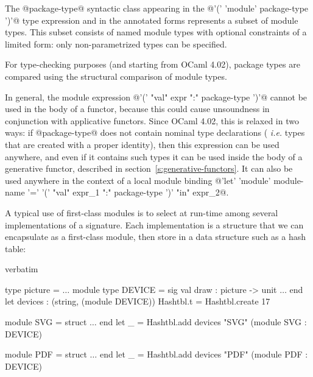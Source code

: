 The @package-type@ syntactic class appearing in the  @'(' 'module'
package-type ')'@ type expression and in the annotated forms represents a
subset of module types.
This subset consists of named module types with optional constraints
of a limited form: only non-parametrized types can be specified.

For type-checking purposes (and starting from OCaml 4.02), package types
are compared using the structural comparison of module types.

In general, the module expression @'(' "val" expr ":" package-type
')'@ cannot be used in the body of a functor, because this could cause
unsoundness in conjunction with applicative functors.
Since OCaml 4.02, this is relaxed in two ways:
if @package-type@ does not contain nominal type declarations ({\em
  i.e.} types that are created with a proper identity), then this
expression can be used anywhere, and even if it contains such types
it can be used inside the body of a generative
functor, described in section~\ref{s:generative-functors}.
It can also be used anywhere in the context of a local module binding
@'let' 'module' module-name '=' '(' "val" expr_1 ":" package-type ')'
 "in" expr_2@.

 A typical use of first-class modules is to
select at run-time among several implementations of a signature.
Each implementation is a structure that we can encapsulate as a
first-class module, then store in a data structure such as a hash
table:
\begin{camlexample}{verbatim}
\begin{caml}
\begin{camlinput}
type picture = $\ldots$
module type DEVICE = sig
  val draw : picture -> unit
  $\ldots$
end
let devices : (string, (module DEVICE)) Hashtbl.t = Hashtbl.create 17

module SVG = struct $\ldots$ end
let _ = Hashtbl.add devices "SVG" (module SVG : DEVICE)

module PDF = struct $\ldots$ end
let _ = Hashtbl.add devices "PDF" (module PDF : DEVICE)
\end{camlinput}
\end{caml}
\end{camlexample}

